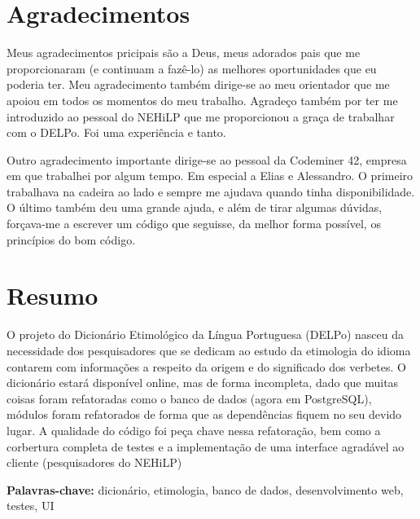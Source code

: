 \documentclass[12pt,twoside,a4paper,openany]{book}
\begin{document}

    \chapter*{Agradecimentos}

    Meus agradecimentos pricipais são a Deus, meus adorados pais que me proporcionaram
    (e continuam a fazê-lo) as melhores oportunidades que eu poderia ter.
    Meu agradecimento também dirige-se ao meu orientador que me apoiou em todos os momentos do meu trabalho.
    Agradeço também por ter me introduzido ao pessoal do NEHiLP que me proporcionou a graça de trabalhar com o DELPo.
    Foi uma experiência e tanto.

    Outro agradecimento importante dirige-se ao pessoal da Codeminer 42, empresa em que
    trabalhei por algum tempo.
    Em especial a Elias e Alessandro.
    O primeiro trabalhava na cadeira ao lado e sempre me ajudava quando tinha disponibilidade.
    O último também deu uma grande ajuda, e além de tirar algumas dúvidas, forçava-me a escrever um código
    que seguisse, da melhor forma possível, os princípios do bom código.


    \chapter*{Resumo}

    O projeto do Dicionário Etimológico da Língua Portuguesa (DELPo) nasceu da necessidade
    dos pesquisadores que se dedicam ao estudo da etimologia do idioma contarem com
    informações a respeito da origem e do significado dos verbetes. O dicionário estará
    disponível online, mas de forma incompleta, dado que muitas coisas foram refatoradas
    como o banco de dados (agora em PostgreSQL), módulos foram refatorados de forma que as
    dependências fiquem no seu devido lugar. A qualidade do código foi peça chave nessa
    refatoração, bem como a corbertura completa de testes e a implementação de uma interface
    agradável ao cliente (pesquisadores do NEHiLP)

    \noindent \textbf{Palavras-chave:} dicionário, etimologia, banco de dados,
    desenvolvimento web, testes, UI

\end{document}
